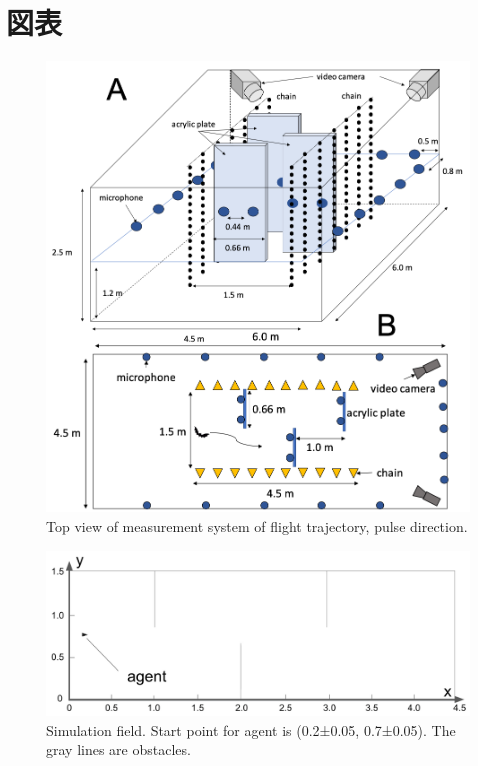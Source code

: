 \documentclass[../main]{subfiles}
\begin{document}
\newpage
\chapter*{図表}

\renewcommand{\figurename}{Fig. } %
\renewcommand{\tablename}{Table } %


\begin{figure}[H]
  \centering
  \includegraphics[width=12cm]{figures/top_view_measure.png}
  \caption{
    Top view of measurement system of flight trajectory,
    pulse direction.
  }\label{fig:top_view_measure}
\end{figure}

\newpage
{}
\begin{figure}[H]
  \centering
  \vfill
  \includegraphics[width=14cm]{figures/simulation_field.png}
  \caption{
    Simulation field.
    Start point for agent is (0.2±0.05, 0.7±0.05).
    The gray lines are obstacles.
  }\label{fig:simulation_field}
\end{figure}
\end{document}
